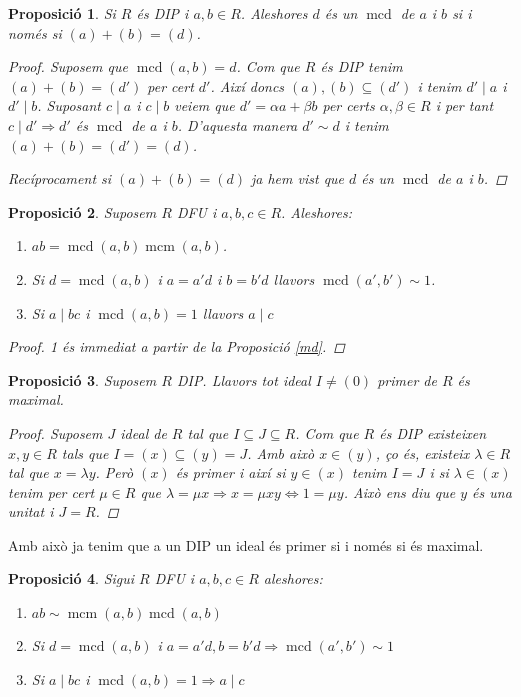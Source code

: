 \documentclass[a4paper,11pt]{report}
\renewcommand{\div}{\mid}
\DeclareMathOperator{\mcd}{mcd}
\DeclareMathOperator{\mcm}{mcm}
\newcommand{\im}{\Rightarrow}
\theoremstyle{theorem}
\newtheorem{proposicio}{\normalfont \sffamily\bfseries Proposició}[section]
\theoremstyle{definition}
\begin{document}
\begin{proposicio}
	Si $R$ és DIP i $a,b\in R$. Aleshores $d$ és un $\mcd$ de $a$ i $b$ si i només si $(a)+(b)=(d)$.\begin{proof}
		Suposem que $\mcd(a,b)=d$. Com que $R$ és DIP tenim $(a)+(b)=(d')$ per cert $d'$.  Així doncs $(a),(b)\subseteq (d')$ i tenim $d'\div a$ i $d'\div b$. Suposant $c\div a$ i $c\div b$ veiem que $d'=\alpha a+\beta b$ per certs $\alpha,\beta\in R$ i per tant $c\div d'\im d'$ és $\mcd$ de $a$ i $b$. D'aquesta manera $d'\sim d$ i tenim $(a)+(b)=(d')=(d)$.
		
		Recíprocament si $(a)+(b)=(d)$ ja hem vist que $d$ és un $\mcd$ de $a$ i $b$.
	\end{proof}
\end{proposicio}
\begin{proposicio}
	Suposem $R$ DFU i $a,b,c\in R$. Aleshores:\begin{enumerate}
		\item $ab=\mcd(a,b)\mcm(a,b)$.\item Si $d=\mcd(a,b)$ i $a=a'd$ 
		i $b=b'd$ llavors $\mcd(a',b')\sim 1$.
		\item Si $a\mid bc$ i $\mcd(a,b)=1$ llavors $a\mid c$
	\end{enumerate}\begin{proof}
	1 és immediat a partir de la Proposició \ref{md}.
\end{proof}
\end{proposicio}
\begin{proposicio}
	Suposem $R$ DIP. Llavors tot ideal $I\neq(0)$ primer de $R$ és maximal.\begin{proof}
		Suposem $J$ ideal de $R$ tal que $I\subseteq J\subseteq R$. Com que $R$ és DIP existeixen $x,y\in R$ tals que $I=(x)\subseteq(y)=J$. Amb això $x\in (y)$, ço és, existeix $\lambda\in R$ tal que $x=\lambda y$. Però $(x)$ és primer i així si $y\in (x)$ tenim $I=J$ i si $\lambda\in(x)$ tenim per cert $\mu\in R$ que $\lambda=\mu x\im x=\mu x y\Leftrightarrow1=\mu y$. Això ens diu que $y$ és una unitat i $J=R$.
	\end{proof}
\end{proposicio}
Amb això ja tenim que a un DIP un ideal és primer si i només si és maximal.
\begin{proposicio}
	Sigui $R$ DFU i $a,b,c\in R$ aleshores:\begin{enumerate}
		\item $ab\sim\mcm(a,b)\mcd(a,b)$\item Si $d=\mcd(a,b)$ i $a=a'd,b=b'd\im \mcd(a',b')\sim 1$\item Si $a\div bc$ i $\mcd(a,b)=1\im a\div c$
	\end{enumerate}
\end{proposicio}
\end{document}
